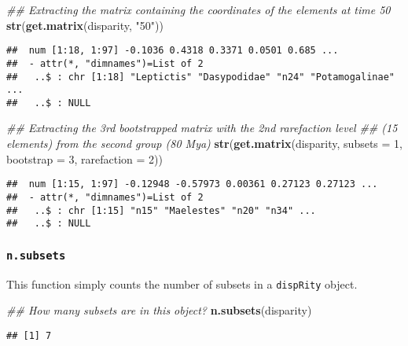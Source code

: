 \documentclass[
]{book}
\newenvironment{Shaded}{\begin{snugshade}}{\end{snugshade}}
\newcommand{\CommentTok}[1]{\textcolor[rgb]{0.56,0.35,0.01}{\textit{#1}}}
\newcommand{\DataTypeTok}[1]{\textcolor[rgb]{0.13,0.29,0.53}{#1}}
\newcommand{\DecValTok}[1]{\textcolor[rgb]{0.00,0.00,0.81}{#1}}
\newcommand{\KeywordTok}[1]{\textcolor[rgb]{0.13,0.29,0.53}{\textbf{#1}}}
\newcommand{\NormalTok}[1]{#1}
\newcommand{\StringTok}[1]{\textcolor[rgb]{0.31,0.60,0.02}{#1}}
\begin{document}
\begin{Shaded}
\begin{Highlighting}[]
\CommentTok{\#\# Extracting the matrix containing the coordinates of the elements at time 50}
\KeywordTok{str}\NormalTok{(}\KeywordTok{get.matrix}\NormalTok{(disparity, }\StringTok{"50"}\NormalTok{))}
\end{Highlighting}
\end{Shaded}

\begin{verbatim}
##  num [1:18, 1:97] -0.1036 0.4318 0.3371 0.0501 0.685 ...
##  - attr(*, "dimnames")=List of 2
##   ..$ : chr [1:18] "Leptictis" "Dasypodidae" "n24" "Potamogalinae" ...
##   ..$ : NULL
\end{verbatim}

\begin{Shaded}
\begin{Highlighting}[]
\CommentTok{\#\# Extracting the 3rd bootstrapped matrix with the 2nd rarefaction level}
\CommentTok{\#\# (15 elements) from the second group (80 Mya)}
\KeywordTok{str}\NormalTok{(}\KeywordTok{get.matrix}\NormalTok{(disparity, }\DataTypeTok{subsets =} \DecValTok{1}\NormalTok{, }\DataTypeTok{bootstrap =} \DecValTok{3}\NormalTok{, }\DataTypeTok{rarefaction =} \DecValTok{2}\NormalTok{))}
\end{Highlighting}
\end{Shaded}

\begin{verbatim}
##  num [1:15, 1:97] -0.12948 -0.57973 0.00361 0.27123 0.27123 ...
##  - attr(*, "dimnames")=List of 2
##   ..$ : chr [1:15] "n15" "Maelestes" "n20" "n34" ...
##   ..$ : NULL
\end{verbatim}

\hypertarget{n.subsets}{%
\subsubsection{\texorpdfstring{\texttt{n.subsets}}{n.subsets}}\label{n.subsets}}

This function simply counts the number of subsets in a \texttt{dispRity} object.

\begin{Shaded}
\begin{Highlighting}[]
\CommentTok{\#\# How many subsets are in this object?}
\KeywordTok{n.subsets}\NormalTok{(disparity)}
\end{Highlighting}
\end{Shaded}

\begin{verbatim}
## [1] 7
\end{verbatim}
\end{document}

